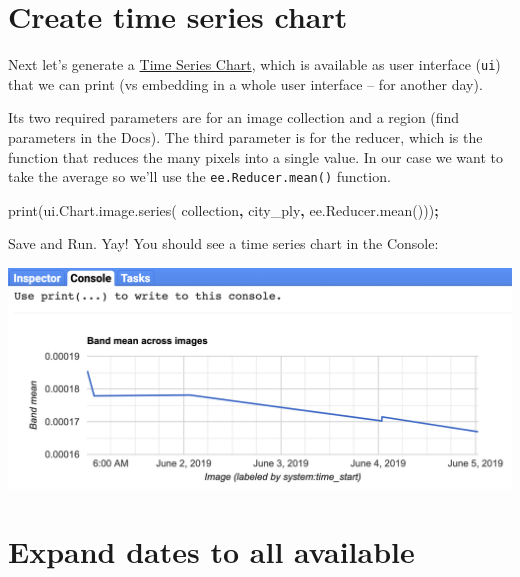 \documentclass[]{book}
\newenvironment{Shaded}{\begin{snugshade}}{\end{snugshade}}
\newcommand{\AttributeTok}[1]{\textcolor[rgb]{0.77,0.63,0.00}{#1}}
\newcommand{\NormalTok}[1]{#1}
\newcommand{\OperatorTok}[1]{\textcolor[rgb]{0.81,0.36,0.00}{\textbf{#1}}}
\newcommand{\VariableTok}[1]{\textcolor[rgb]{0.00,0.00,0.00}{#1}}
\begin{document}
\hypertarget{create-time-series-chart}{%
\section{Create time series chart}\label{create-time-series-chart}}

Next let's generate a \href{https://developers.google.com/earth-engine/charts_image_series}{Time Series Chart}, which is available as user interface (\texttt{ui}) that we can print (vs embedding in a whole user interface -- for another day).

Its two required parameters are for an image collection and a region (find parameters in the Docs). The third parameter is for the reducer, which is the function that reduces the many pixels into a single value. In our case we want to take the average so we'll use the \texttt{ee.Reducer.mean()} function.

\begin{Shaded}
\begin{Highlighting}[]
\AttributeTok{print}\NormalTok{(}\VariableTok{ui}\NormalTok{.}\VariableTok{Chart}\NormalTok{.}\VariableTok{image}\NormalTok{.}\AttributeTok{series}\NormalTok{(}
\NormalTok{  collection}\OperatorTok{,} 
\NormalTok{  city_ply}\OperatorTok{,} 
  \VariableTok{ee}\NormalTok{.}\VariableTok{Reducer}\NormalTok{.}\AttributeTok{mean}\NormalTok{()))}\OperatorTok{;}
\end{Highlighting}
\end{Shaded}

Save and Run. Yay! You should see a time series chart in the Console:

\includegraphics{images/gee_ts-chart_1-week.png}

\hypertarget{expand-dates-to-all-available}{%
\section{Expand dates to all available}\label{expand-dates-to-all-available}}
\end{document}
